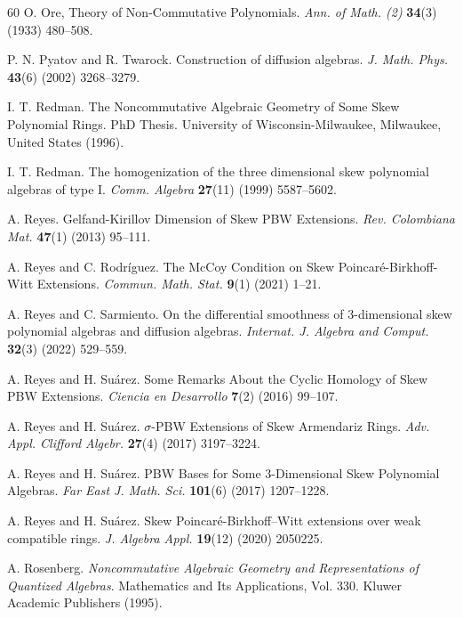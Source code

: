 \documentclass{amsart}
\theoremstyle{definition}
\theoremstyle{remark}
\numberwithin{equation}{section}
\begin{document}
\begin{thebibliography}{60}
 O. Ore, Theory of Non-Commutative Polynomials. {\em Ann. of Math. (2)} {\bf 34}(3) (1933) 480--508.

 P. N. Pyatov and R. Twarock. Construction of diffusion algebras. {\em J. Math. Phys.} {\bf 43}(6) (2002) 3268--3279.


 I. T. Redman. The Noncommutative Algebraic Geometry of Some Skew Polynomial Rings. PhD Thesis. University of Wisconsin-Milwaukee, Milwaukee, United States (1996).

 I. T. Redman. The homogenization of the three dimensional skew polynomial algebras of type I. {\em Comm. Algebra} {\bf 27}(11) (1999) 5587--5602.

 A. Reyes. Gelfand-Kirillov Dimension of Skew PBW Extensions. {\em Rev. Colombiana Mat.} {\bf 47}(1) (2013) 95--111.

 A. Reyes and C. Rodr\'iguez. The McCoy Condition on Skew Poincar\'e-Birkhoff-Witt Extensions. {\em Commun. Math. Stat.} {\bf 9}(1) (2021) 1--21.

 A. Reyes and C. Sarmiento. On the differential smoothness of 3-dimensional skew polynomial algebras and diffusion algebras. {\em Internat. J. Algebra and Comput.} {\bf 32}(3) (2022) 529--559.

 A. Reyes and H. Su\'arez. Some Remarks About the Cyclic Homology of Skew PBW Extensions. {\em Ciencia en Desarrollo} {\bf 7}(2) (2016) 99--107.

 A. Reyes and H. Su\'arez. $\sigma$-{P}{B}{W} Extensions of Skew {A}rmendariz Rings. {\em Adv. Appl. Clifford Algebr.} {\bf 27}(4) (2017) 3197--3224.

 A. Reyes and H. Su\'arez. PBW Bases for Some 3-Dimensional Skew Polynomial Algebras. {\em Far East J. Math. Sci.} {\bf 101}(6) (2017) 1207--1228.

 A. Reyes and H. Su\'arez. Skew Poincar\'e-Birkhoff–Witt extensions over weak compatible rings. {\em J. Algebra Appl.} {\bf 19}(12) (2020) 2050225.

 A. Rosenberg. {\em Noncommutative Algebraic Geometry and Representations of Quantized Algebras}. Mathematics and Its Applications, Vol. 330. Kluwer Academic Publishers (1995).


\end{thebibliography}
\end{document}
